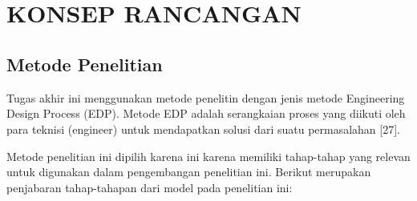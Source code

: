 
\chapter{\\ KONSEP RANCANGAN}

\section{Metode Penelitian}
Tugas akhir ini menggunakan metode penelitin dengan jenis metode Engineering Design Process (EDP). Metode EDP adalah serangkaian proses yang diikuti oleh para teknisi (engineer) untuk mendapatkan solusi dari suatu permasalahan [27].

Metode penelitian ini dipilih karena ini karena memiliki tahap-tahap yang relevan untuk digunakan dalam pengembangan penelitian ini. Berikut merupakan penjabaran tahap-tahapan dari model  pada penelitian ini:

